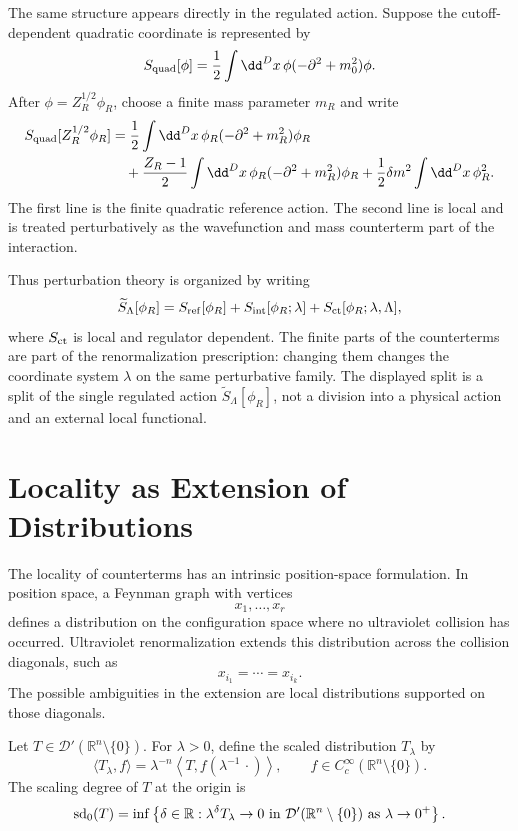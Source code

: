The same structure appears directly in the regulated action.  Suppose the
cutoff-dependent quadratic coordinate is represented by
\[
  S_{\rm quad}[\phi]
  =
  \frac12\int \dd^Dx\,
  \phi(-\partial^2+m_0^2)\phi .
\]
After \(\phi=Z_R^{1/2}\phi_R\), choose a finite mass parameter \(m_R\) and
write
\[
\begin{aligned}
  S_{\rm quad}[Z_R^{1/2}\phi_R]
  &=
  \frac12\int \dd^Dx\,
  \phi_R(-\partial^2+m_R^2)\phi_R     \\
  &\quad
  +
  \frac{Z_R-1}{2}
  \int \dd^Dx\,
  \phi_R(-\partial^2+m_R^2)\phi_R
  +
  \frac12\delta m^2
  \int \dd^Dx\,\phi_R^2 .
\end{aligned}
\]
The first line is the finite quadratic reference action.  The second line is
local and is treated perturbatively as the wavefunction and mass counterterm
part of the interaction.

Thus perturbation theory is organized by writing
\[
  \widetilde S_{\Lambda}[\phi_R]
  =
  S_{\rm ref}[\phi_R]
  +
  S_{\rm int}[\phi_R;\lambda]
  +
  S_{\rm ct}[\phi_R;\lambda,\Lambda],
\]
where \(S_{\rm ct}\) is local and regulator dependent.  The finite parts of
the counterterms are part of the renormalization prescription: changing them
changes the coordinate system \(\lambda\) on the same perturbative family.
The displayed split is a split of the single regulated action
\(\widetilde S_\Lambda[\phi_R]\), not a division into a physical action and an
external local functional.

\section{Locality as Extension of Distributions}

The locality of counterterms has an intrinsic position-space formulation.  In
position space, a Feynman graph with vertices
\[
  x_1,\ldots,x_r
\]
defines a distribution on the configuration space where no ultraviolet
collision has occurred.  Ultraviolet renormalization extends this distribution
across the collision diagonals, such as
\[
  x_{i_1}=\cdots=x_{i_k}.
\]
The possible ambiguities in the extension are local distributions supported on
those diagonals.

\begin{definition}
\label{def:scaling-degree}
Let \(T\in\mathcal D'(\mathbb R^n\setminus\{0\})\).  For \(\lambda>0\), define
the scaled distribution \(T_\lambda\) by
\[
  \langle T_\lambda,f\rangle
  =
  \lambda^{-n}
  \left\langle T, f(\lambda^{-1}\,\cdot)\right\rangle ,
  \qquad f\in C_c^\infty(\mathbb R^n\setminus\{0\}).
\]
The scaling degree of \(T\) at the origin is
\[
  \operatorname{sd}_0(T)
  =
  \inf\left\{\delta\in\mathbb R:
  \lambda^\delta T_\lambda\to0
  \ \hbox{in}\ \mathcal D'(\mathbb R^n\setminus\{0\})
  \ \hbox{as}\ \lambda\to0^+\right\}.
\]
\end{definition}

